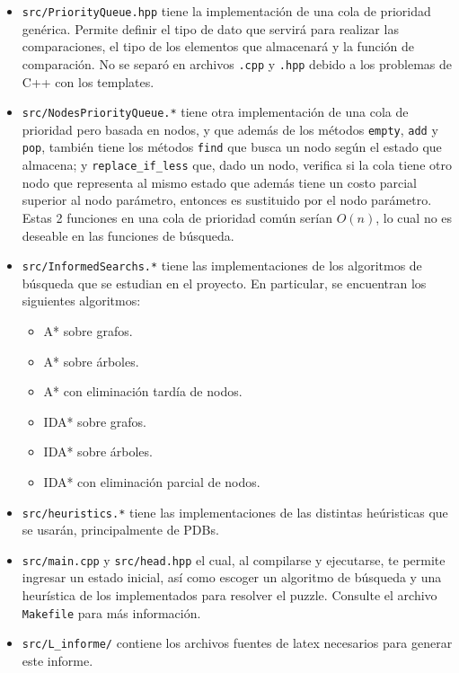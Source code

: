 \documentclass[a4paper,10pt]{article}
\begin{document}
\begin{itemize}
\begin{itemize}
      \item \verb|src/PriorityQueue.hpp| tiene la implementaci\'on de una cola de 
      prioridad gen\'erica. Permite definir el tipo de dato que servir\'a para realizar 
      las comparaciones, el tipo de los elementos que almacenar\'a y la funci\'on de 
      comparaci\'on. No se separ\'o en archivos \verb|.cpp| y \verb|.hpp| debido a los 
      problemas de C++ con los templates.

      \item \verb|src/NodesPriorityQueue.*| tiene otra implementaci\'on de una cola de 
      prioridad pero basada en nodos, y que adem\'as de los m\'etodos 
      \verb|empty|, \verb|add| y \verb|pop|, tambi\'en tiene los m\'etodos \verb|find|
      que busca un nodo seg\'un el estado que almacena; y \verb|replace_if_less| que,
      dado un nodo, verifica si la cola tiene otro nodo que representa al mismo estado
      que adem\'as tiene un costo parcial superior al nodo par\'ametro, entonces es 
      sustituido por el nodo par\'ametro. Estas 2 funciones en una cola de prioridad 
      com\'un ser\'ian $O(n)$, lo cual no es deseable en las funciones de b\'usqueda.

      \item \verb|src/InformedSearchs.*| tiene las implementaciones de los algoritmos
      de b\'usqueda que se estudian en el proyecto. En particular, se encuentran los 
      siguientes algoritmos:
      \begin{itemize}
        \item A* sobre grafos.
        \item A* sobre \'arboles.
        \item A* con eliminaci\'on tard\'ia de nodos.
        \item IDA* sobre grafos.
        \item IDA* sobre \'arboles.
        \item IDA* con eliminaci\'on parcial de nodos.
      \end{itemize}

      \item \verb|src/heuristics.*| tiene las implementaciones de las distintas 
      he\'uristicas que se usar\'an, principalmente de PDBs.

      \item \verb|src/main.cpp| y \verb|src/head.hpp| el cual, al compilarse y
      ejecutarse, te permite ingresar un estado inicial, as\'i como escoger un
      algoritmo de b\'usqueda y una heur\'istica de los implementados para resolver
      el puzzle. Consulte el archivo \verb|Makefile| para m\'as informaci\'on.
      
      \item \verb|src/L_informe/| contiene los archivos fuentes de latex necesarios 
      para generar este informe.
    \end{itemize}
    
  \end{itemize}
\end{document}
